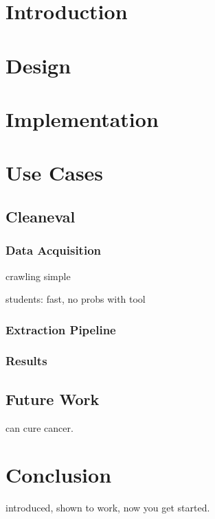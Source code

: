 \begin{abstract}

\end{abstract}

\section{Introduction}


\section{Design}


\section{Implementation}


\section{Use Cases}

\subsection{Cleaneval}
\subsubsection{Data Acquisition}
crawling simple

students: fast, no probs with tool

\subsubsection{Extraction Pipeline}

\subsubsection{Results}

\subsection{Future Work}
can cure cancer.

\section{Conclusion}
introduced, shown to work, now you get started.


